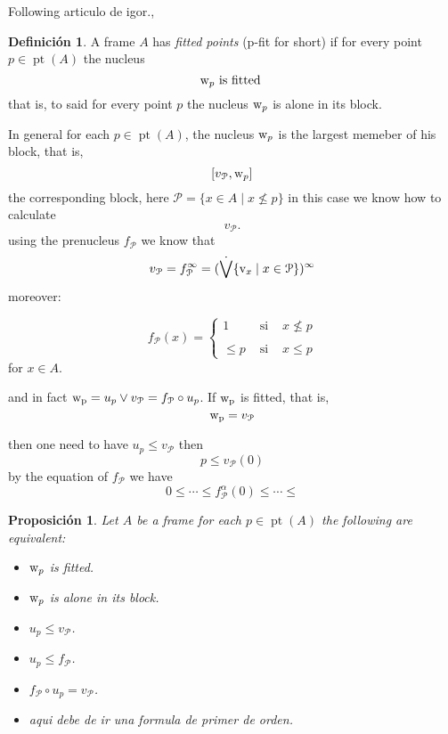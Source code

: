 \documentclass[11pt]{amsart}
\DeclareMathOperator{\pt}{pt}
\theoremstyle{plain}
\newtheorem{prop}[thm]{Proposición}
\theoremstyle{definition}
\newtheorem{dfn}[thm]{Definición}
\begin{document}
Following articulo de igor.,

\begin{dfn}\label{pfit}
A frame $A$ has \emph{fitted points} ({\rm p-fit} for short) if for every point $p\in\pt(A)$ the nucleus \[{\rm w}_{p} \text{ is fitted }\]
that is, to said for every point $p$ the nucleus ${\rm w}_{p}$ is alone in its block.
\end{dfn}



In general for each $p\in\pt(A)$, the nucleus ${\rm w}_{p}$ is the largest memeber of his block, that is,
\[[v_{\mathcal{P}},{\rm w}_{p}]\] the corresponding block, here $\mathcal{P}=\{x\in A\mid x\nleq p\}$ 
in this case we know how to calculate \[v_{\mathcal{P}}.\] using the prenucleus $f_{\mathcal{P}}$
we know that \[v_{\mathcal{P}}=f_{\mathcal{P}}^{\infty}=(\dot{\bigvee}\{{\rm v}_{x}\mid x\in\mathcal{P}\})^{\infty}\]
moreover:

\[
f_{\mathcal{P}}(x)=\left\{
	\begin{array}{lcc}
1 & \mbox{ si } & x\nleq p\\
\\
\leq p & \mbox{ si } & x\leq p
\end{array}\right.
\]
for $x\in A$.


and in fact ${\rm w_{p}}=u_{p}\vee v_{\mathcal{P}}=f_{\mathcal{P}}\circ u_{p}$. If ${\rm w_{p}}$ is fitted, that is, \[{\rm w_{p}}=v_{\mathcal{P}}\]

then one need to have $u_{p}\leq v_{\mathcal{P}}$ then \[p\leq v_{\mathcal{P}}(0)\] by the equation of $f_{\mathcal{P}}$ we have \[0\leq\cdots\leq f_{\mathcal{P}}^{\alpha}(0)\leq\cdots\leq\]


\begin{prop}\label{pfitequiv}
Let $A$ be a frame for each $p\in\pt(A)$ the following are equivalent:
 \begin{itemize}
\item[(i)] ${\rm w}_{p}$ is fitted.
\item[(ii)] ${\rm w}_{p}$ is alone in its block.
\item[(iii)] $u_{p}\leq v_{\mathcal{P}}$.
\item[(iv)] $u_{p}\leq f_{\mathcal{P}}$.
\item[(v)] $f_{\mathcal{P}}\circ u_{p}=v_{\mathcal{P}}$.
\item[(vi)] aqui debe de ir una formula de primer de orden.
 \end{itemize}
\end{prop}	
\end{document}
